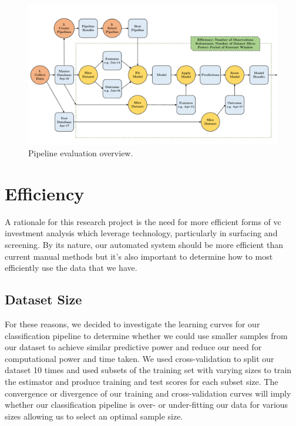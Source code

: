 \documentclass[../thesis/thesis.tex]{subfiles}
\begin{document}
\begin{figure}[!htb]
    \centering
    \includegraphics[width=\textwidth]{../figures/evaluation/pipeline_evaluation}
    \caption[Pipeline evaluation flowchart]{Pipeline evaluation overview.}
    \label{fig:evaluation:pipeline_evaluation}
\end{figure}

\section{Efficiency}

A rationale for this research project is the need for more efficient forms of \gls{vc} investment analysis which leverage technology, particularly in surfacing and screening. By its nature, our automated system should be more efficient than current manual methods but it's also important to determine how to most efficiently use the data that we have. %

\subsection{Dataset Size}

For these reasons, we decided to investigate the learning curves for our classification pipeline to determine whether we could use smaller samples from our dataset to achieve similar predictive power and reduce our need for computational power and time taken. We used cross-validation to split our dataset 10 times and used subsets of the training set with varying sizes to train the estimator and produce training and test scores for each subset size. The convergence or divergence of our training and cross-validation curves will imply whether our classification pipeline is over- or under-fitting our data for various sizes allowing us to select an optimal sample size. %
\end{document}
